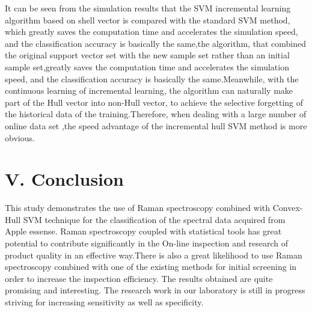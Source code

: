 \documentclass[a4paper]{article}
\begin{document}
It can be seen from the simulation results that the SVM incremental learning algorithm based on shell vector is compared with the standard SVM method, which greatly saves the computation time and accelerates the simulation speed, and the classification accuracy is basically the same,the algorithm, that combined the original support vector set with the new sample set rather than an initial sample set,greatly saves the computation time and accelerates the simulation speed, and the classification accuracy is basically the same.Meanwhile, with the continuous learning of incremental learning, the algorithm can naturally make part of the Hull vector into non-Hull vector, to achieve the selective forgetting of the historical data of the training.Therefore, when dealing with a large number of online data set ,the speed advantage of the incremental hull SVM method is more obvious.



\section{V.	Conclusion}
This  study  demonstrates  the  use  of  Raman  spectroscopy  combined  with Convex-Hull SVM  technique  for the  classification  of  the  spectral  data  acquired  from  Apple essense. Raman  spectroscopy  coupled  with  statistical  tools  has  great  potential  to  contribute significantly in the On-line inspection and research of product quality in an effective way.There is also a great  likelihood  to  use  Raman  spectroscopy  combined  with  one  of  the  existing  methods  for initial screening in order to increase the inspection efficiency. The results obtained are quite promising and interesting. The research work in our laboratory is still in progress striving for increasing sensitivity as well as specificity.
\end{document}
